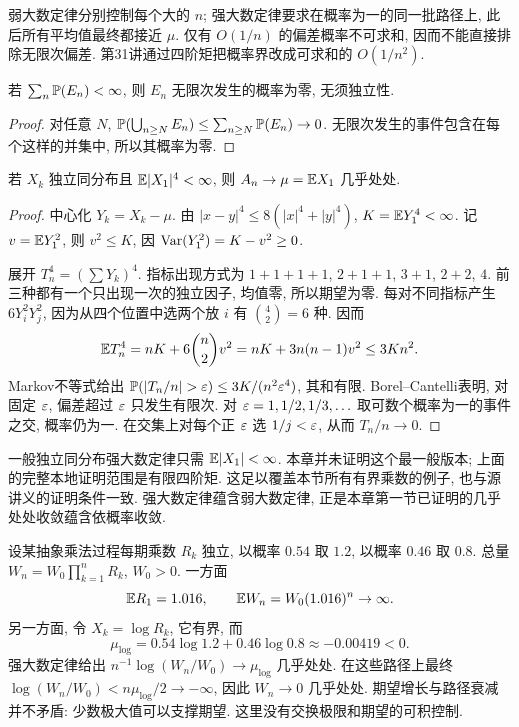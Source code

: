 弱大数定律分别控制每个大的 $n$; 强大数定律要求在概率为一的同一批路径上, 此后所有平均值最终都接近 $\mu$. 仅有 $O(1/n)$ 的偏差概率不可求和, 因而不能直接排除无限次偏差. 第31讲通过四阶矩把概率界改成可求和的 $O(1/n^2)$.
\begin{lemma}
若 $\sum_n\mathbb P(E_n)<\infty$, 则 $E_n$ 无限次发生的概率为零, 无须独立性.
\end{lemma}
\begin{proof}
对任意 $N$, $\mathbb P(\bigcup_{n\geq N}E_n)\leq\sum_{n\geq N}\mathbb P(E_n)\to0$. 无限次发生的事件包含在每个这样的并集中, 所以其概率为零.
\end{proof}
\begin{theorem}[本章证明的强大数定律版本]
若 $X_k$ 独立同分布且 $\mathbb E|X_1|^4<\infty$, 则 $A_n\to\mu=\mathbb E X_1$ 几乎处处.
\end{theorem}
\begin{proof}
中心化 $Y_k=X_k-\mu$. 由 $|x-y|^4\leq8(|x|^4+|y|^4)$, $K=\mathbb E Y_1^4<\infty$. 记 $v=\mathbb E Y_1^2$, 则 $v^2\leq K$, 因 $\operatorname{Var}(Y_1^2)=K-v^2\geq0$.

展开 $T_n^4=(\sum Y_k)^4$. 指标出现方式为 $1+1+1+1$, $2+1+1$, $3+1$, $2+2$, $4$. 前三种都有一个只出现一次的独立因子, 均值零, 所以期望为零. 每对不同指标产生 $6Y_i^2Y_j^2$, 因为从四个位置中选两个放 $i$ 有 $\binom42=6$ 种. 因而
\[\mathbb E T_n^4=nK+6\binom n2v^2=nK+3n(n-1)v^2\leq3Kn^2.\]
Markov不等式给出
$\Prob(|T_n/n|>\eps)\leq3K/(n^2\eps^4)$, 其和有限. Borel--Cantelli表明, 对固定 $\varepsilon$, 偏差超过 $\varepsilon$ 只发生有限次. 对 $\varepsilon=1,1/2,1/3,\ldots$ 取可数个概率为一的事件之交, 概率仍为一. 在交集上对每个正 $\varepsilon$ 选 $1/j<\varepsilon$, 从而 $T_n/n\to0$.
\end{proof}
\begin{remark}
一般独立同分布强大数定律只需 $\mathbb E|X_1|<\infty$. 本章并未证明这个最一般版本; 上面的完整本地证明范围是有限四阶矩. 这足以覆盖本节所有有界乘数的例子, 也与源讲义的证明条件一致. 强大数定律蕴含弱大数定律, 正是本章第一节已证明的几乎处处收敛蕴含依概率收敛.
\end{remark}
\begin{example}
设某抽象乘法过程每期乘数 $R_k$ 独立, 以概率 $0.54$ 取 $1.2$, 以概率 $0.46$ 取 $0.8$. 总量 $W_n=W_0\prod_{k=1}^nR_k$, $W_0>0$. 一方面
\[\mathbb E R_1=1.016,\qquad \mathbb E W_n=W_0(1.016)^n\to\infty.\]
另一方面, 令 $X_k=\log R_k$, 它有界, 而
\[\mu_{\log}=0.54\log1.2+0.46\log0.8\approx-0.00419<0.\]
强大数定律给出 $n^{-1}\log(W_n/W_0)\to\mu_{\log}$ 几乎处处. 在这些路径上最终 $\log(W_n/W_0)<n\mu_{\log}/2\to-\infty$, 因此 $W_n\to0$ 几乎处处. 期望增长与路径衰减并不矛盾: 少数极大值可以支撑期望. 这里没有交换极限和期望的\mbox{可积控制.}
\end{example}


